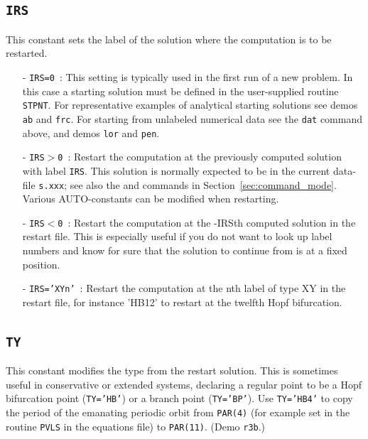 \documentclass[12pt]{report}
\begin{document}
\subsection{\texttt{IRS}}  \label{sec:IRS}
This constant sets the label of the solution where the computation
is to be restarted.
\begin{itemize}
\item[-] {\tt IRS=0}~:  
  This setting is typically used in the first run of a new problem.
  In this case a starting solution must be defined in the user-supplied
  routine {\tt STPNT}.
  For representative examples of analytical starting solutions 
  see demos {\tt ab} and {\tt frc}.
  For starting from unlabeled numerical data see the {\tt dat} command
  above, and demos {\tt lor} and {\tt pen}.
  
\item[-] {\tt IRS$>$0}~: 
  Restart the computation at the previously computed solution with label {\tt IRS}. 
  This solution is normally expected to be in the current data-file 
 {\tt s.xxx}; see also the  and  commands in 
 Section~\ref{sec:command_mode}.
 Various {\cal AUTO}-constants can be modified when restarting.

\item[-] {\tt IRS$<$0}~:
  Restart the computation at the -IRSth computed solution in the
  restart file. This is especially useful if you do not want to look
  up label numbers and know for sure that the solution to continue
  from is at a fixed position.
\item[-] {\tt IRS='XYn'}~:
  Restart the computation at the nth label of type XY in the
  restart file, for instance 'HB12' to restart at the twelfth Hopf
  bifurcation.
\end{itemize}

\subsection{\texttt{TY}} \label{sec:TY} 
 This constant modifies the type from the restart solution.
 This is sometimes useful in conservative or extended systems,
 declaring a regular point to be a Hopf bifurcation point ({\tt TY='HB'}) or a
 branch point ({\tt TY='BP'}). Use {\tt TY='HB4'} to copy the period
 of the emanating periodic orbit from {\tt PAR(4)} (for example set in
 the routine {\tt PVLS} in the equations file) to {\tt PAR(11)}.
 (Demo {\tt r3b}.)
\end{document}
